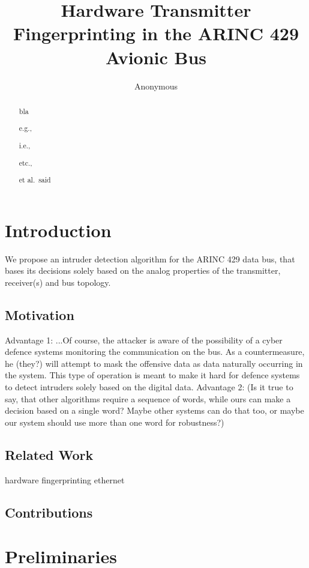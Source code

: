 \documentclass[conference]{IEEEtran}
\title{Hardware Transmitter Fingerprinting in the ARINC 429 Avionic Bus}
\author{Anonymous}
\begin{document}
\maketitle

\begin{abstract}
    bla
    
    e.g., 
    
    i.e.,
    
    etc.,
    
    et al.\ said
    
\end{abstract}


\section{Introduction}
  \color{gray}
  We propose an intruder detection algorithm for the ARINC 429 data bus, that bases its decisions solely based on the analog properties of the transmitter, receiver(s) and bus topology.
  \color{black}

\subsection{Motivation}
  \color{gray}
  Advantage 1: ...Of course, the attacker is aware of the possibility of a cyber defence systems monitoring the communication on the bus. As a countermeasure, he (they?) will attempt to mask the offensive data as data naturally occurring in the system. This type of operation is meant to make it hard for defence systems to detect intruders solely based on the digital data. Advantage 2: (Is it true to say, that other algorithms require a sequence of words, while ours can make a decision based on a single word? Maybe other systems can do that too, or maybe our system should use more than one word for robustness?)
  \color{black}

\subsection{Related Work}

\color{gray}
hardware fingerprinting ethernet

\cite{kneib2018scission}
\color{black}


\subsection{Contributions}

\section{Preliminaries}
\end{document}
